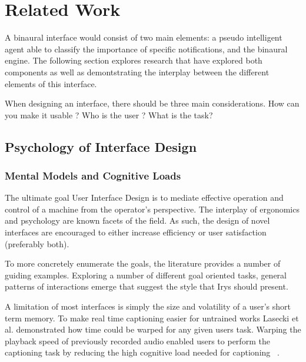 \newpage                                                 \chapter{Related Work}



A binaural interface would consist of two main elements: a pseudo intelligent
agent able to classify the importance of specific notifications, and the
binaural engine.  The following section explores research that have explored
both components as well as demontstrating the interplay between the different
elements of this interface.



When designing an interface, there should be three main considerations.
How can you make it usable ?
Who is the user ?
What is the task?



\section{                  Psychology of Interface Design                     }

\subsection{                  Mental Models and Cognitive Loads               }

The ultimate goal User Interface Design is to mediate effective operation and
control of a machine from the operator's perspective. The interplay of
ergonomics and psychology are known facets of the field. As such, the design
of novel interfaces are encouraged to either increase efficiency or user
satisfaction (preferably both).

To more concretely enumerate the goals, the literature provides a number of
guiding examples.  Exploring a number of different goal oriented tasks, general
patterns of interactions emerge that suggest the style that Irys should present.


A limitation of most interfaces is simply the size and volatility of a user's
short term memory.  To make real time captioning easier for untrained works
Lasecki et al. demonstrated how time could be warped for any given users task.
Warping the playback speed of previously recorded audio enabled users to perform
the captioning task by reducing the high cognitive load needed for captioning
~\cite{lasecki2013warping}.


